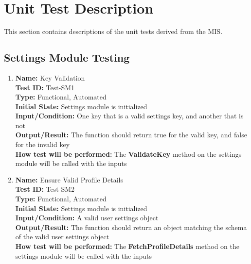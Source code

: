 \documentclass[12pt, titlepage]{article}
\begin{document}
\pagebreak


\section{Unit Test Description}

This section contains descriptions of the unit tests derived from the MIS.

\subsection{Settings Module Testing}
\begin{enumerate}
  \item \textbf{Name:} Key Validation \label{itm:Test-SM1} \\
        \textbf{Test ID:} Test-SM1 \\
        \textbf{Type:} Functional, Automated \\
        \textbf{Initial State:} Settings module is initialized \\
        \textbf{Input/Condition:} One key that is a valid settings key, and another that is not  \\
        \textbf{Output/Result:} The function should return true for the valid key, and false for the invalid key  \\
        \textbf{How test will be performed:} The \textbf{ValidateKey} method on the settings module will be called with the inputs

  \item \textbf{Name:} Ensure Valid Profile Details \label{itm:Test-SM2} \\
        \textbf{Test ID:} Test-SM2 \\
        \textbf{Type:} Functional, Automated \\
        \textbf{Initial State:} Settings module is initialized \\
        \textbf{Input/Condition:} A valid user settings object  \\
        \textbf{Output/Result:} The function should return an object matching the schema of the valid user settings object  \\
        \textbf{How test will be performed:} The \textbf{FetchProfileDetails} method on the settings module will be called with the inputs

\end{enumerate}
\end{document}
